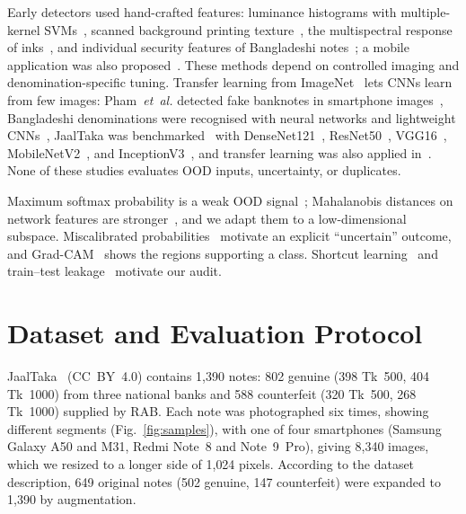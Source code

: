 \documentclass[journal]{IEEEtran}
\begin{document}
Early detectors used hand-crafted features: luminance histograms with multiple-kernel
SVMs~\cite{yeh2011}, scanned background printing texture~\cite{berenguel2016}, the
multispectral response of inks~\cite{baek2018}, and individual security features of
Bangladeshi notes~\cite{uddin2016}; a mobile application was also
proposed~\cite{dittimi2018}. These methods depend on controlled imaging and
denomination-specific tuning. Transfer learning from
ImageNet~\cite{deng2009imagenet,yosinski2014transferable} lets CNNs learn from few
images: Pham~\textit{et~al.} detected fake banknotes in smartphone
images~\cite{pham2020,pham2022}, Bangladeshi denominations were recognised with neural
networks and lightweight CNNs~\cite{jahangir2007,linkon2020}, JaalTaka was
benchmarked~\cite{piyas2025jaaltaka} with DenseNet121~\cite{huang2017densenet},
ResNet50~\cite{he2016resnet}, VGG16~\cite{simonyan2015vgg},
MobileNetV2~\cite{sandler2018mobilenetv2}, and InceptionV3~\cite{szegedy2016inception},
and transfer learning was also applied in~\cite{tabassum2025}. None of these studies
evaluates OOD inputs, uncertainty, or duplicates.

Maximum softmax probability is a weak OOD signal~\cite{hendrycks2017baseline};
Mahalanobis distances on network features are stronger~\cite{lee2018mahalanobis}, and
we adapt them to a low-dimensional subspace. Miscalibrated
probabilities~\cite{guo2017calibration} motivate an explicit ``uncertain'' outcome, and
Grad-CAM~\cite{selvaraju2017gradcam} shows the regions supporting a class. Shortcut
learning~\cite{geirhos2020shortcut} and train--test leakage~\cite{kapoor2023leakage}
motivate our audit.

\section{Dataset and Evaluation Protocol}
\label{sec:data}

JaalTaka~\cite{piyas2025jaaltaka,jaaltaka_data} (CC~BY~4.0) contains 1{,}390 notes:
802 genuine (398 Tk~500, 404 Tk~1000) from three national banks and 588 counterfeit
(320 Tk~500, 268 Tk~1000) supplied by RAB. Each note was photographed six times, showing
different segments (Fig.~\ref{fig:samples}), with one of four smartphones (Samsung Galaxy
A50 and M31, Redmi Note~8 and Note~9~Pro), giving 8{,}340 images, which we resized to a
longer side of 1{,}024 pixels. According to the dataset description, 649 original notes
(502 genuine, 147 counterfeit) were expanded to 1{,}390 by augmentation.
\end{document}
